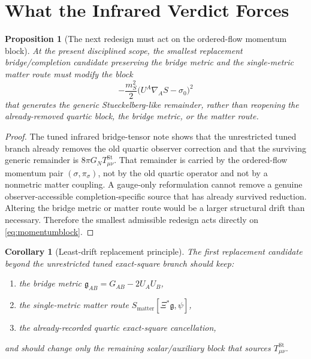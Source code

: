 \documentclass[11pt]{article}
\newcommand{\BridgeMetric}{\mathfrak{g}}
\newtheorem{proposition}{Proposition}
\newtheorem{corollary}{Corollary}
\begin{document}
\section{What the Infrared Verdict Forces}

\begin{proposition}[The next redesign must act on the ordered-flow momentum block]
\label{prop:actonmomentum}
At the present disciplined scope, the smallest replacement bridge/completion candidate preserving the bridge metric and the single-metric matter route must modify the block
\begin{equation}
-\frac{m_S^2}{2}\bigl(U^A\nabla_A S-\sigma_0\bigr)^2
\label{eq:momentumblock}
\end{equation}
that generates the generic Stueckelberg-like remainder, rather than reopening the already-removed quartic block, the bridge metric, or the matter route.
\end{proposition}

\begin{proof}
The tuned infrared bridge-tensor note shows that the unrestricted tuned branch already removes the old quartic observer correction and that the surviving generic remainder is \(8\pi G_NT_{\mu\nu}^{\mathrm{St}}\). That remainder is carried by the ordered-flow momentum pair \((\sigma,\pi_\sigma)\), not by the old quartic operator and not by a nonmetric matter coupling. A gauge-only reformulation cannot remove a genuine observer-accessible completion-specific source that has already survived reduction. Altering the bridge metric or matter route would be a larger structural drift than necessary. Therefore the smallest admissible redesign acts directly on \eqref{eq:momentumblock}.
\end{proof}

\begin{corollary}[Least-drift replacement principle]
\label{cor:leastdrift}
The first replacement candidate beyond the unrestricted tuned exact-square branch should keep:
\begin{enumerate}
    \item the bridge metric \(\BridgeMetric_{AB}=G_{AB}-2U_AU_B\),
    \item the single-metric matter route \(S_{\mathrm{matter}}[\Xi^\ast\BridgeMetric,\psi]\),
    \item the already-recorded quartic exact-square cancellation,
\end{enumerate}
and should change only the remaining scalar/auxiliary block that sources \(T_{\mu\nu}^{\mathrm{St}}\).
\end{corollary}
\end{document}
